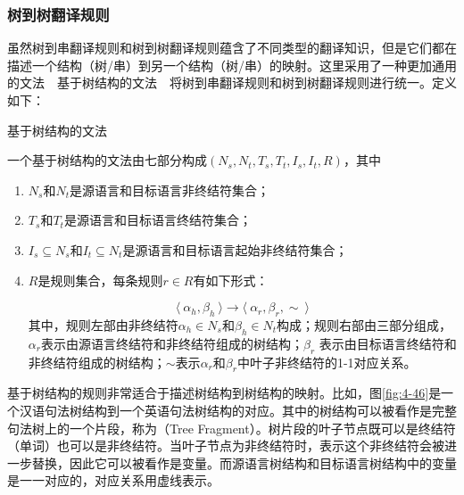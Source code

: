 
\subsubsection{树到树翻译规则}

\parinterval 虽然树到串翻译规则和树到树翻译规则蕴含了不同类型的翻译知识，但是它们都在描述一个结构（树/串）到另一个结构（树/串）的映射。这里采用了一种更加通用的文法\ \dash \ 基于树结构的文法\ \dash \ 将树到串翻译规则和树到树翻译规则进行统一。定义如下：

\vspace{0.5em}
\begin{definition} 基于树结构的文法

{\small
一个基于树结构的文法由七部分构成$(N_s, N_t, T_s, T_t, I_s, I_t, R)$，其中
\begin{enumerate}
\item $N_s$和$N_t$是源语言和目标语言非终结符集合；
\item $T_s$和$T_t$是源语言和目标语言终结符集合；
\item $I_s \subseteq N_s$和$I_t \subseteq N_t$是源语言和目标语言起始非终结符集合；
\item $R$是规则集合，每条规则$r \in R$有如下形式：

\begin{displaymath}
\langle\  \alpha_h, \beta_h\ \rangle \to \langle\ \alpha_r, \beta_r, \sim\ \rangle
\end{displaymath}
其中，规则左部由非终结符$\alpha_h \in N_s$和$\beta_h \in N_t$构成；规则右部由三部分组成，$\alpha_r$表示由源语言终结符和非终结符组成的树结构；$\beta_r$ 表示由目标语言终结符和非终结符组成的树结构；$\sim$表示$\alpha_r$和$\beta_r$中叶子非终结符的1-1对应关系。
\end{enumerate}
}
\end{definition}

\parinterval 基于树结构的规则非常适合于描述树结构到树结构的映射。比如，图\ref{fig:4-46}是一个汉语句法树结构到一个英语句法树结构的对应。其中的树结构可以被看作是完整句法树上的一个片段，称为{\small{}}（Tree Fragment）。树片段的叶子节点既可以是终结符（单词）也可以是非终结符。当叶子节点为非终结符时，表示这个非终结符会被进一步替换，因此它可以被看作是变量。而源语言树结构和目标语言树结构中的变量是一一对应的，对应关系用虚线表示。

